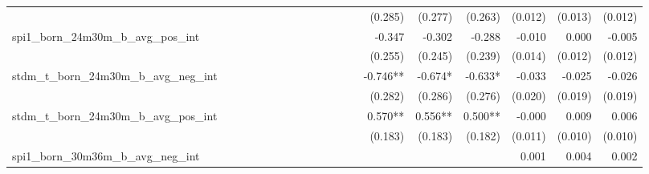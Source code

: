 \begin{tabular}{lrrrrrrrrrrrrrrrrrr}
                                            &              &              &              &              &              &              &              &              &               &              &              &               &      (0.285) &      (0.277) &       (0.263) &      (0.012) &      (0.013) &       (0.012) \\ 
spi1\_born\_24m30m\_b\_avg\_pos\_int        &              &              &              &              &              &              &              &              &               &              &              &               &       -0.347 &       -0.302 &        -0.288 &       -0.010 &        0.000 &        -0.005 \\ 
                                            &              &              &              &              &              &              &              &              &               &              &              &               &      (0.255) &      (0.245) &       (0.239) &      (0.014) &      (0.012) &       (0.012) \\ 
stdm\_t\_born\_24m30m\_b\_avg\_neg\_int     &              &              &              &              &              &              &              &              &               &              &              &               &     -0.746** &      -0.674* &       -0.633* &       -0.033 &       -0.025 &        -0.026 \\ 
                                            &              &              &              &              &              &              &              &              &               &              &              &               &      (0.282) &      (0.286) &       (0.276) &      (0.020) &      (0.019) &       (0.019) \\ 
stdm\_t\_born\_24m30m\_b\_avg\_pos\_int     &              &              &              &              &              &              &              &              &               &              &              &               &      0.570** &      0.556** &       0.500** &       -0.000 &        0.009 &         0.006 \\ 
                                            &              &              &              &              &              &              &              &              &               &              &              &               &      (0.183) &      (0.183) &       (0.182) &      (0.011) &      (0.010) &       (0.010) \\ 
spi1\_born\_30m36m\_b\_avg\_neg\_int        &              &              &              &              &              &              &              &              &               &              &              &               &              &              &               &        0.001 &        0.004 &         0.002 \\ 

\end{tabular}
